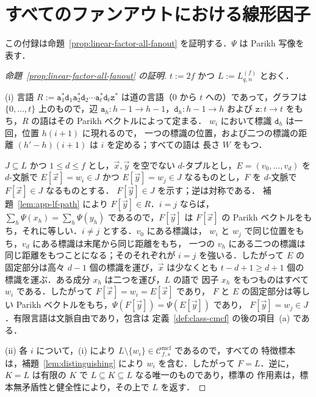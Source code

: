 \documentclass[11pt,a4paper]{ltjsarticle}
\numberwithin{equation}{section}
\theoremstyle{plain}
\theoremstyle{definition}
\theoremstyle{remark}
\newcommand{\Cmcf}[2]{\mathcal{C}^{\mathrm{mcf}}_{#1,#2}}
\newcommand{\tuple}[1]{\vec{#1}}
\theoremstyle{plain}
\begin{document}
\section{すべてのファンアウトにおける線形因子}
\label{app:linear-factor-fanout}

この付録は命題~\ref{prop:linear-factor-all-fanout} を証明する．$\Psi$ は Parikh 写像を表す．

\begin{proof}[命題~\ref{prop:linear-factor-all-fanout} の証明]
$t:=2f$ かつ $L:=L^{(f)}_{q,n}$ とおく．

(i) 言語 $R:=\mathtt a_1^*\mathtt d_1\mathtt a_2^*\mathtt d_2\cdots
\mathtt a_t^*\mathtt d_t\mathtt z^*$ は道の言語（$0$ から $t$ への）であって，グラフは
$\{0,\ldots,t\}$ 上のもので，辺 $\mathtt a_h:h-1\to h-1$，$\mathtt d_h:h-1\to h$ および
$\mathtt z:t\to t$ をもち，$R$ の語はその Parikh ベクトルによって定まる．
$w_i$ において標識 $\mathtt d_h$ は一回，位置 $h(i+1)$ に現れるので，
一つの標識の位置，および二つの標識の距離 $(h'-h)(i+1)$ は $i$ を定める；すべての語は
長さ $W$ をもつ．

$J\subseteq L$ かつ $1\le d\le f$ とし，$\tuple x,\tuple y$ を空でない
$d$-タプルとし，$E=(v_0,\ldots,v_d)$ を $d$-文脈で $E[\tuple x]=w_i\in J$ かつ
$E[\tuple y]=w_j\in J$ なるものとし，$F$ を $d$-文脈で $F[\tuple x]\in J$ なるものとする．
$F[\tuple y]\in J$ を示す；逆は対称である．
補題~\ref{lem:app-lf-path} により $F[\tuple y]\in R$．$i=j$ ならば，
$\sum_h\Psi(x_h)=\sum_h\Psi(y_h)$ であるので，$F[\tuple y]$ は
$F[\tuple x]$ の Parikh ベクトルをもち，それに等しい．$i\ne j$ とする．$v_0$ にある標識は，
$w_i$ と $w_j$ で同じ位置をもち，$v_d$ にある標識は末尾から同じ距離をもち，
一つの $v_h$ にある二つの標識は同じ距離をもつことになる；そのそれぞれが $i=j$ を強いる．したがって
$E$ の固定部分は高々 $d-1$ 個の標識を運び，$\tuple x$ は少なくとも
$t-d+1\ge d+1$ 個の標識を運ぶ．ある成分 $x_h$ は二つを運び，$L$ の語で
因子 $x_h$ をもつものはすべて $w_i$ である．したがって $F[\tuple x]=w_i=E[\tuple x]$ であり，
$F$ と $E$ の固定部分は等しい Parikh ベクトルをもち，$\Psi(F[\tuple y])=\Psi(E[\tuple y])$ であり，
$F[\tuple y]=w_j\in J$．有限言語は文脈自由であり，包含は
定義~\ref{def:class-cmcf} の後の項目~(a) である．

(ii) 各 $i$ について，(i) により $L\setminus\{w_i\}\in\Cmcf{f}{s}$ であるので，すべての
特徴標本は，補題~\ref{lem:distinguishing} により $w_i$ を含む．したがって
$F=L$．逆に，
$K=L$ は有限の $K$ で $L\subseteq K\subseteq L$ なる唯一のものであり，標準の
作用素は，標本無矛盾性と健全性により，その上で $L$ を返す．


\end{proof}
\end{document}
